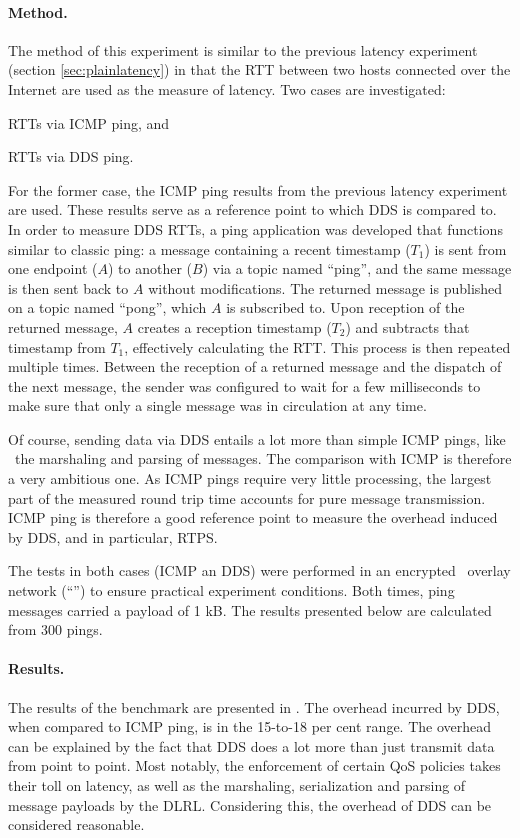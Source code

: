 \paragraph{Method.} The method of this experiment is similar to the previous latency experiment (section \ref{sec:plainlatency}) in that the RTT between two hosts connected over the Internet are used as the measure of latency. Two cases are investigated:
\begin{inparaenum}[(i)]
	\item RTTs via ICMP ping, and
	\item RTTs via DDS ping.
\end{inparaenum}
For the former case, the ICMP ping results from the previous latency experiment are used. These results serve as a reference point to which DDS is compared to. In order to measure DDS RTTs, a ping application was developed that functions similar to classic ping: a message containing a recent timestamp ($T_1$) is sent from one endpoint ($A$) to another ($B$) via a topic named ``ping'', and the same message is then sent back to $A$ without modifications. The returned message is published on a topic named ``pong'', which $A$ is subscribed to. Upon reception of the returned message, $A$ creates a reception timestamp ($T_2$) and subtracts that timestamp from $T_1$, effectively calculating the RTT. This process is then repeated multiple times. Between the reception of a returned message and the dispatch of the next message, the sender was configured to wait for a few milliseconds to make sure that only a single message was in circulation at any time.

Of course, sending data via DDS entails a lot more than simple ICMP pings, like \eg\ the marshaling and parsing of messages. The comparison with ICMP is therefore a very ambitious one. As ICMP pings require very little processing, the largest part of the measured round trip time accounts for pure message transmission. ICMP ping is therefore a good reference point to measure the overhead induced by DDS, and in particular, RTPS.

The tests in both cases (ICMP an DDS) were performed in an encrypted \wnet\ overlay network (``'') to ensure practical experiment conditions. Both times, ping messages carried a payload of 1 kB. The results presented below are calculated from 300 pings.


\paragraph{Results.}
The results of the benchmark are presented in . The overhead incurred by DDS, when compared to ICMP ping, is in the 15-to-18 per cent range. The overhead can be explained by the fact that DDS does a lot more than just transmit data from point to point. Most notably, the enforcement of certain QoS policies takes their toll on latency, as well as the marshaling, serialization and parsing of message payloads by the DLRL. Considering this, the overhead of DDS can be considered reasonable.

